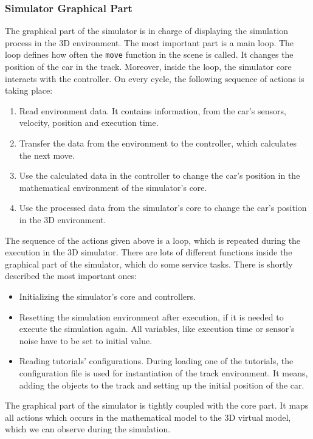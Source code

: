 \subsubsection{Simulator Graphical Part}
The graphical part of the simulator is in charge of displaying the simulation process in the 3D environment. The most important part is a main loop. The loop defines how often the \texttt{move} function in the scene is called. It changes the position of the car in the track. Moreover, inside the loop, the simulator core interacts with the controller. On every cycle, the following sequence of actions is taking place:
\begin{enumerate}
    \item Read environment data. It contains information, from the car's sensors, velocity, position and execution time.
    \item Transfer the data from the environment to the controller, which calculates the next move.
    \item Use the calculated data in the controller to change the car's position in the mathematical environment of the simulator's core.
    \item Use the processed data from the simulator's core to change the car's position in the 3D environment.
\end{enumerate}
The sequence of the actions given above is a loop, which is repeated during the execution in the 3D simulator. There are lots of different functions inside the graphical part of the simulator, which do some service tasks. There is shortly described the most important ones:
\begin{itemize}
    \item Initializing the simulator's core and controllers.
    \item Resetting the simulation environment after execution, if it is needed to execute the simulation again. All variables, like execution time or sensor's noise have to be set to initial value.
    \item Reading tutorials' configurations. During loading one of the tutorials, the configuration file is used for instantiation of the track environment. It means, adding the objects to the track and setting up the initial position of the car.
\end{itemize}
The graphical part of the simulator is tightly coupled with the core part. It maps all actions which occurs in the mathematical model to the 3D virtual model, which we can observe during the simulation. 

